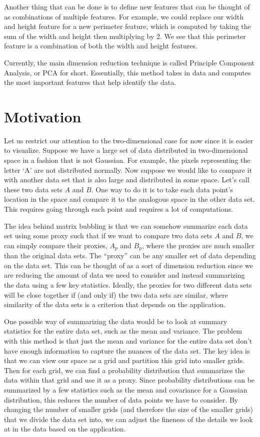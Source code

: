\documentclass{article}
\begin{document}
Another thing that can be done is to define new features that can be thought of as combinations of multiple features. For example, we could replace our width and height feature for a new perimeter feature, which is computed by taking the sum of the width and height then multiplying by 2. We see that this perimeter feature is a combination of both the width and height features.

Currently, the main dimension reduction technique is called Principle Component Analysis, or PCA for short. Essentially, this method takes in data and computes the most important features that help identify the data.

\section{Motivation}

Let us restrict our attention to the two-dimensional case for now since it is easier to visualize. Suppose we have a large set of data distributed in two-dimensional space in a fashion that is not Gaussian. For example, the pixels representing the letter `A' are not distributed normally. Now suppose we would like to compare it with another data set that is also large and distributed in some space. Let's call these two data sets $A$ and $B$. One way to do it is to take each data point's location in the space and compare it to the analogous space in the other data set. This requires going through each point and requires a lot of computations.

The idea behind matrix bubbling is that we can somehow summarize each data set using some proxy such that if we want to compare two data sets $A$ and $B$, we can simply compare their proxies, $A_p$ and $B_p$, where the proxies are much smaller than the original data sets. The ``proxy'' can be any smaller set of data depending on the data set. This can be thought of as a sort of dimension reduction since we are reducing the amount of data we need to consider and instead summarizing the data using a few key statistics. Ideally, the proxies for two different data sets will be close together if (and only if) the two data sets are similar, where similarity of the data sets is a criterion that depends on the application.

One possible way of summarizing the data would be to look at summary statistics for the entire data set, such as the mean and variance. The problem with this method is that just the mean and variance for the entire data set don't have enough information to capture the nuances of the data set. The key idea is that we can view our space as a grid and partition this grid into smaller grids. Then for each grid, we can find a probability distribution that summarizes the data within that grid and use it as a proxy. Since probability distributions can be summarized by a few statistics such as the mean and covariance for a Gaussian distribution, this reduces the number of data points we have to consider. By changing the number of smaller grids (and therefore the size of the smaller grids) that we divide the data set into, we can adjust the fineness of the details we look at in the data based on the application.
\end{document}
